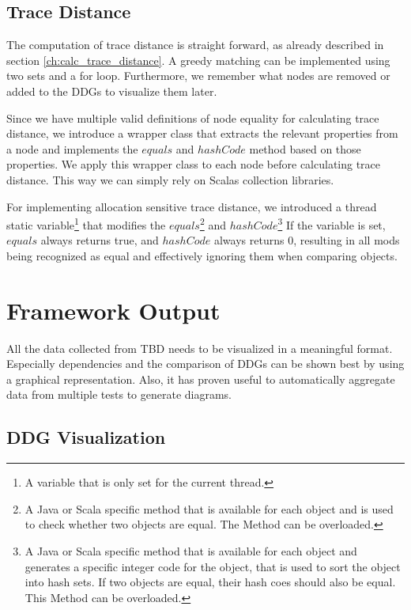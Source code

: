 \subsection{Trace Distance}

The computation of trace distance is straight forward, as already described in section \ref{ch:calc_trace_distance}. A greedy matching can be implemented using two sets and a for loop. Furthermore, we remember what nodes are removed or added to the DDGs to visualize them later.

Since we have multiple valid definitions of node equality for calculating trace distance, we introduce a wrapper class that extracts the relevant properties from a node and implements the $equals$ and $hashCode$ method based on those properties. We apply this wrapper class to each node before calculating trace distance. This way we can simply rely on Scalas collection libraries.

For implementing allocation sensitive trace distance, we introduced a thread static variable\footnote{A variable that is only set for the current thread.} that modifies the $equals$\footnote{A Java or Scala specific method that is available for each object and is used to check whether two objects are equal. The Method can be overloaded.} and $hashCode$\footnote{A Java or Scala specific method that is available for each object and generates a specific integer code for the object, that is used to sort the object into hash sets. If two objects are equal, their hash coes should also be equal. This Method can be overloaded.} If the variable is set, $equals$ always returns true, and $hashCode$ always returns $0$, resulting in all mods being recognized as equal and effectively ignoring them when comparing objects. 

\section{Framework Output}

All the data collected from TBD needs to be visualized in a meaningful format. Especially dependencies and the comparison of DDGs can be shown best by using a graphical representation. Also, it has proven useful to automatically aggregate data from multiple tests to generate diagrams. 

\subsection{DDG Visualization}

